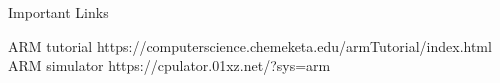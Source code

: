 


\begin{frame}{Important Links}

    ARM tutorial https://computerscience.chemeketa.edu/armTutorial/index.html ARM
    simulator https://cpulator.01xz.net/?sys=arm

\end{frame}
